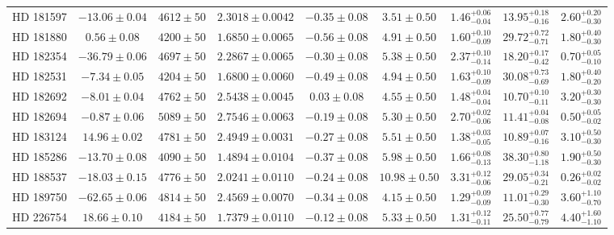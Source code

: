 \begin{table*}
\begin{tabular}{ccccccccc}
HD 181597 & $-13.06 \pm 0.04$ & $4612 \pm 50$ & $2.3018 \pm 0.0042$ & $-0.35 \pm 0.08$ & $3.51 \pm 0.50$ & $1.46^{+0.06}_{-0.04}$ & $13.95^{+0.18}_{-0.16}$ & $2.60^{+0.20}_{-0.30}$ \\
HD 181880 & $0.56 \pm 0.08$ & $4200 \pm 50$ & $1.6850 \pm 0.0065$ & $-0.56 \pm 0.08$ & $4.91 \pm 0.50$ & $1.60^{+0.10}_{-0.09}$ & $29.72^{+0.72}_{-0.71}$ & $1.80^{+0.40}_{-0.30}$ \\
HD 182354 & $-36.79 \pm 0.06$ & $4697 \pm 50$ & $2.2867 \pm 0.0065$ & $-0.30 \pm 0.08$ & $5.38 \pm 0.50$ & $2.37^{+0.10}_{-0.14}$ & $18.20^{+0.17}_{-0.42}$ & $0.70^{+0.05}_{-0.10}$ \\
HD 182531 & $-7.34 \pm 0.05$ & $4204 \pm 50$ & $1.6800 \pm 0.0060$ & $-0.49 \pm 0.08$ & $4.94 \pm 0.50$ & $1.63^{+0.10}_{-0.09}$ & $30.08^{+0.73}_{-0.69}$ & $1.80^{+0.40}_{-0.20}$ \\
HD 182692 & $-8.01 \pm 0.04$ & $4762 \pm 50$ & $2.5438 \pm 0.0045$ & $0.03 \pm 0.08$ & $4.55 \pm 0.50$ & $1.48^{+0.04}_{-0.04}$ & $10.70^{+0.10}_{-0.11}$ & $3.20^{+0.30}_{-0.30}$ \\
HD 182694 & $-0.87 \pm 0.06$ & $5089 \pm 50$ & $2.7546 \pm 0.0063$ & $-0.19 \pm 0.08$ & $5.30 \pm 0.50$ & $2.70^{+0.02}_{-0.06}$ & $11.41^{+0.04}_{-0.08}$ & $0.50^{+0.05}_{-0.02}$ \\
HD 183124 & $14.96 \pm 0.02$ & $4781 \pm 50$ & $2.4949 \pm 0.0031$ & $-0.27 \pm 0.08$ & $5.51 \pm 0.50$ & $1.38^{+0.03}_{-0.05}$ & $10.89^{+0.07}_{-0.16}$ & $3.10^{+0.50}_{-0.30}$ \\
HD 185286 & $-13.70 \pm 0.08$ & $4090 \pm 50$ & $1.4894 \pm 0.0104$ & $-0.37 \pm 0.08$ & $5.98 \pm 0.50$ & $1.66^{+0.08}_{-0.13}$ & $38.30^{+0.80}_{-1.18}$ & $1.90^{+0.50}_{-0.30}$ \\
HD 188537 & $-18.03 \pm 0.15$ & $4776 \pm 50$ & $2.0241 \pm 0.0110$ & $-0.24 \pm 0.08$ & $10.98 \pm 0.50$ & $3.31^{+0.12}_{-0.06}$ & $29.05^{+0.34}_{-0.21}$ & $0.26^{+0.02}_{-0.02}$ \\
HD 189750 & $-62.65 \pm 0.06$ & $4814 \pm 50$ & $2.4569 \pm 0.0070$ & $-0.34 \pm 0.08$ & $4.15 \pm 0.50$ & $1.29^{+0.09}_{-0.09}$ & $11.01^{+0.29}_{-0.30}$ & $3.60^{+1.10}_{-0.70}$ \\
HD 226754 & $18.66 \pm 0.10$ & $4184 \pm 50$ & $1.7379 \pm 0.0110$ & $-0.12 \pm 0.08$ & $5.33 \pm 0.50$ & $1.31^{+0.12}_{-0.11}$ & $25.50^{+0.77}_{-0.79}$ & $4.40^{+1.60}_{-1.10}$ \\
\hline
\end{tabular}
\end{table*}
